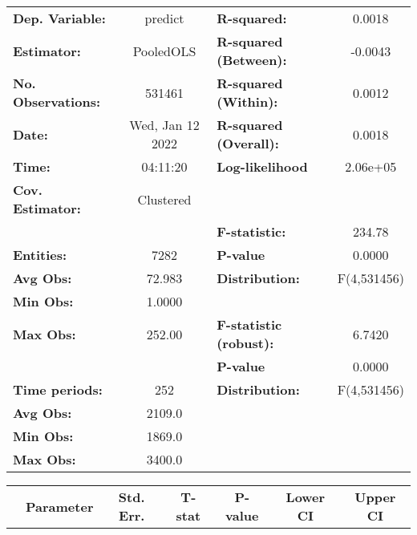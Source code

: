 \begin{center}
\begin{tabular}{lclc}
\toprule
\textbf{Dep. Variable:}    &      predict       & \textbf{  R-squared:         }   &      0.0018      \\
\textbf{Estimator:}        &     PooledOLS      & \textbf{  R-squared (Between):}  &     -0.0043      \\
\textbf{No. Observations:} &       531461       & \textbf{  R-squared (Within):}   &      0.0012      \\
\textbf{Date:}             &  Wed, Jan 12 2022  & \textbf{  R-squared (Overall):}  &      0.0018      \\
\textbf{Time:}             &      04:11:20      & \textbf{  Log-likelihood     }   &     2.06e+05     \\
\textbf{Cov. Estimator:}   &     Clustered      & \textbf{                     }   &                  \\
\textbf{}                  &                    & \textbf{  F-statistic:       }   &      234.78      \\
\textbf{Entities:}         &        7282        & \textbf{  P-value            }   &      0.0000      \\
\textbf{Avg Obs:}          &       72.983       & \textbf{  Distribution:      }   &   F(4,531456)    \\
\textbf{Min Obs:}          &       1.0000       & \textbf{                     }   &                  \\
\textbf{Max Obs:}          &       252.00       & \textbf{  F-statistic (robust):} &      6.7420      \\
\textbf{}                  &                    & \textbf{  P-value            }   &      0.0000      \\
\textbf{Time periods:}     &        252         & \textbf{  Distribution:      }   &   F(4,531456)    \\
\textbf{Avg Obs:}          &       2109.0       & \textbf{                     }   &                  \\
\textbf{Min Obs:}          &       1869.0       & \textbf{                     }   &                  \\
\textbf{Max Obs:}          &       3400.0       & \textbf{                     }   &                  \\
\bottomrule
\end{tabular}
\begin{tabular}{lcccccc}
                & \textbf{Parameter} & \textbf{Std. Err.} & \textbf{T-stat} & \textbf{P-value} & \textbf{Lower CI} & \textbf{Upper CI}  \\

\end{tabular}
\end{center}
